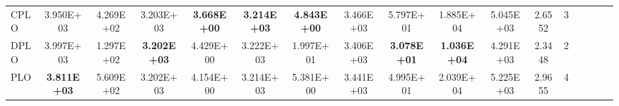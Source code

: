 \documentclass[review]{elsarticle}
\begin{document}
\begin{table}
\begin{tabular}{@{} lcccccccccccccccc @{}}
CPLO       & 3.950E+03          & 4.269E+02          & 3.203E+03          & \textbf{3.668E+00} & \textbf{3.214E+03} & \textbf{4.843E+00} & 3.466E+03          & 5.797E+01          & 1.885E+04          & 5.045E+03          & 2.6552               & 3                   &                    &                    &                    &                    \\
DPLO       & 3.997E+03          & 1.297E+02          & \textbf{3.202E+03} & 4.429E+00          & 3.222E+03          & 1.997E+01          & 3.406E+03          & \textbf{3.078E+01} & \textbf{1.036E+04} & 4.291E+03          & 2.3448               & 2                   &                    &                    &                    &                    \\
PLO        & \textbf{3.811E+03} & 5.609E+02          & 3.202E+03          & 4.154E+00          & 3.214E+03          & 5.381E+00          & 3.441E+03          & 4.995E+01          & 2.039E+04          & 5.225E+03          & 2.9655               & 4                   &                    &                    &                    &                   \\ \bottomrule
\end{tabular}
\end{table}


\end{document}

